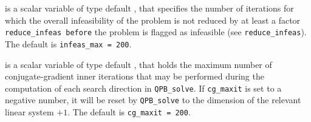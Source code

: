 \begin{description}




 is a scalar variable of type default \integer, that specifies
the number of iterations for which the overall infeasibility
of the problem is not reduced by at least a factor {\tt reduce\_infeas
before} the problem is flagged as infeasible (see {\tt reduce\_infeas}).
The default is {\tt infeas\_max = 200}.

 is a scalar variable of type default \integer, that holds the
maximum number of conjugate-gradient inner iterations that may be performed
during the computation of each search direction in {\tt QPB\_solve}.
If {\tt cg\_maxit} is set to a negative number, it will be reset by 
{\tt QPB\_solve} to the dimension of the relevant linear system $+ 1$.
The default is {\tt cg\_maxit = 200}.




\end{description}
